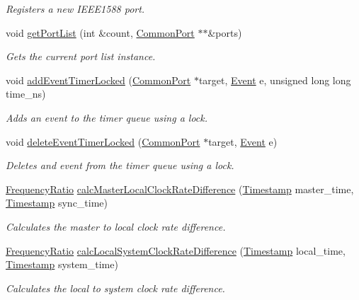 \begin{DoxyCompactItemize}
\begin{DoxyCompactList}\small\item\em Registers a new I\+E\+E\+E1588 port. \end{DoxyCompactList}\item 
void \hyperlink{class_i_e_e_e1588_clock_a92094c4bd83a368921aef482e115f7df}{get\+Port\+List} (int \&count, \hyperlink{class_common_port}{Common\+Port} $\ast$$\ast$\&ports)
\begin{DoxyCompactList}\small\item\em Gets the current port list instance. \end{DoxyCompactList}\item 
void \hyperlink{class_i_e_e_e1588_clock_a4747f09108bd78ecd68d58dad4358d77}{add\+Event\+Timer\+Locked} (\hyperlink{class_common_port}{Common\+Port} $\ast$target, \hyperlink{class_event}{Event} e, unsigned long long time\+\_\+ns)
\begin{DoxyCompactList}\small\item\em Adds an event to the timer queue using a lock. \end{DoxyCompactList}\item 
void \hyperlink{class_i_e_e_e1588_clock_ab3079a65b0509eeb40c2828fa6a7834a}{delete\+Event\+Timer\+Locked} (\hyperlink{class_common_port}{Common\+Port} $\ast$target, \hyperlink{class_event}{Event} e)
\begin{DoxyCompactList}\small\item\em Deletes and event from the timer queue using a lock. \end{DoxyCompactList}\item 
\hyperlink{ptptypes_8hpp_a84de47dc2ed889ecd2b61706d3ad0f2e}{Frequency\+Ratio} \hyperlink{class_i_e_e_e1588_clock_ae64f563f95acf6c4962698563cee8964}{calc\+Master\+Local\+Clock\+Rate\+Difference} (\hyperlink{class_timestamp}{Timestamp} master\+\_\+time, \hyperlink{class_timestamp}{Timestamp} sync\+\_\+time)
\begin{DoxyCompactList}\small\item\em Calculates the master to local clock rate difference. \end{DoxyCompactList}\item 
\hyperlink{ptptypes_8hpp_a84de47dc2ed889ecd2b61706d3ad0f2e}{Frequency\+Ratio} \hyperlink{class_i_e_e_e1588_clock_af78760f9002bfad5f7494c49907f91b9}{calc\+Local\+System\+Clock\+Rate\+Difference} (\hyperlink{class_timestamp}{Timestamp} local\+\_\+time, \hyperlink{class_timestamp}{Timestamp} system\+\_\+time)
\begin{DoxyCompactList}\small\item\em Calculates the local to system clock rate difference. \end{DoxyCompactList}\item 
$$
\end{DoxyCompactItemize}
